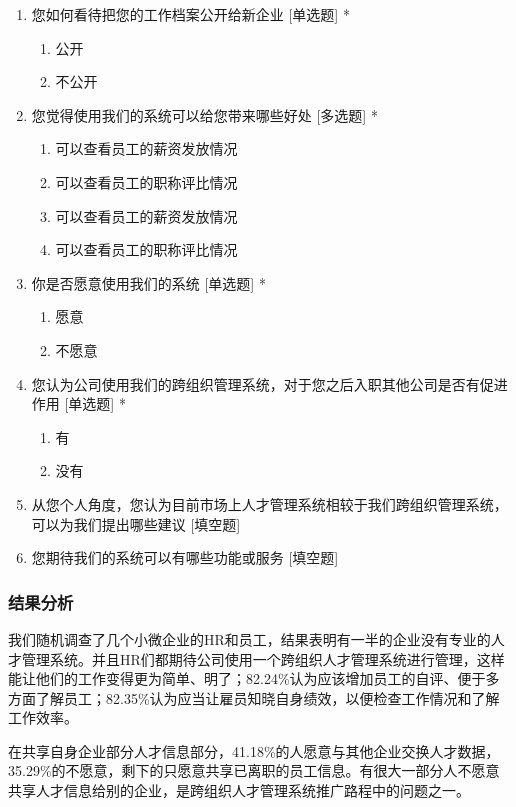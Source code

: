 \documentclass[UTF8]{ctexart}
\begin{document}
\begin{enumerate}[1.]
\begin{enumerate}
	\end{enumerate}
	\item 您如何看待把您的工作档案公开给新企业 [单选题] *
	\begin{enumerate}
		\item 公开
		\item 不公开
	\end{enumerate}
	\item 您觉得使用我们的系统可以给您带来哪些好处 [多选题] *
	\begin{enumerate}
		\item 可以查看员工的薪资发放情况
		\item 可以查看员工的职称评比情况
		\item 可以查看员工的薪资发放情况
		\item 可以查看员工的职称评比情况
	\end{enumerate}
	\item 你是否愿意使用我们的系统 [单选题] *
	\begin{enumerate}
		\item 愿意
		\item 不愿意
	\end{enumerate}
	\item 您认为公司使用我们的跨组织管理系统，对于您之后入职其他公司是否有促进作用 [单选题] *
	\begin{enumerate}
		\item 有
		\item 没有
	\end{enumerate}
	\item 从您个人角度，您认为目前市场上人才管理系统相较于我们跨组织管理系统，可以为我们提出哪些建议 [填空题]
	\item 您期待我们的系统可以有哪些功能或服务 [填空题]
\end{enumerate}
\subsubsection{结果分析}
我们随机调查了几个小微企业的HR和员工，结果表明有一半的企业没有专业的人才管理系统。并且HR们都期待公司使用一个跨组织人才管理系统进行管理，这样能让他们的工作变得更为简单、明了；82.24\%认为应该增加员工的自评、便于多方面了解员工；82.35\%认为应当让雇员知晓自身绩效，以便检查工作情况和了解工作效率。


在共享自身企业部分人才信息部分，41.18\%的人愿意与其他企业交换人才数据，35.29\%的不愿意，剩下的只愿意共享已离职的员工信息。有很大一部分人不愿意共享人才信息给别的企业，是跨组织人才管理系统推广路程中的问题之一。
\end{document}
